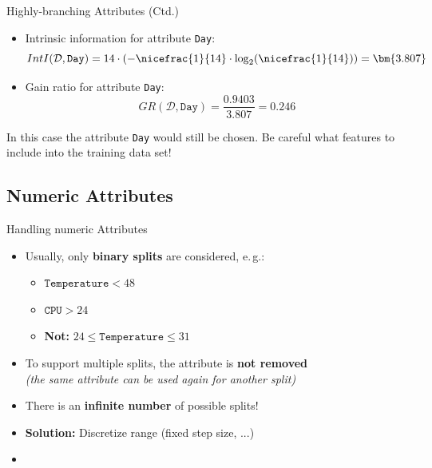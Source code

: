 \begin{frame}{Highly-branching Attributes (Ctd.)}{}
	\begin{itemize}
		\item Intrinsic information for attribute \texttt{Day}:
		\begin{equation}
			IntI(\mathcal{D}, \texttt{Day}) = 14 \cdot (-\nicefrac{1}{14} \cdot \log_2 (\nicefrac{1}{14})) = \bm{3.807}
		\end{equation}
		\item Gain ratio for attribute \texttt{Day}:
		\begin{equation}
			GR(\mathcal{D}, \texttt{Day}) = \frac{0.9403}{3.807} = \bm{0.246}
		\end{equation}
	\end{itemize}

	\vspace*{-3mm}
	\begin{boxBlueNoFrame}
		\footnotesize
		In this case the attribute \texttt{Day} would still be chosen.
		Be careful what features to include into the training data set! 
	\end{boxBlueNoFrame}
\end{frame}


\subsection{Numeric Attributes}

\begin{frame}{Handling numeric Attributes}{}
	\begin{itemize}
		\item Usually, only \textbf{binary splits} are considered, e.\,g.:
		\begin{itemize}
			\item $\texttt{Temperature} < 48$
			\item $\texttt{CPU} > 24$
			\item \textbf{Not:} $24 \le \texttt{Temperature} \le 31$
		\end{itemize}
		\item To support multiple splits, the attribute is \textbf{not removed} \\
			{\footnotesize \textit{(the same attribute can be used again for another split)}}
		\item {} There is an \textbf{infinite number} of possible splits!
		\item \textbf{Solution:} Discretize range (fixed step size, ...)
		\item {}
	\end{itemize}
\end{frame}


